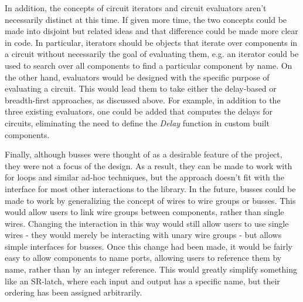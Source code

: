 \documentclass{article}
\newcommand{\FunctionName}[1]{\textit{#1}}
\begin{document}
In addition, the concepts of circuit iterators and circuit evaluators aren’t necessarily distinct at this time. If given more time, the two concepts could be made into disjoint but related ideas and that difference could be made more clear in code. In particular, iterators should be objects that iterate over components in a circuit without necessarily the goal of evaluating them, e.g. an iterator could be used to search over all components to find a particular component by name. On the other hand, evaluators would be designed with the specific purpose of evaluating a circuit. This would lead them to take either the delay-based or breadth-first approaches, as discussed above. For example, in addition to the three existing evaluators, one could be added that computes the delays for circuits, eliminating the need to define the \FunctionName{Delay} function in custom built components.

Finally, although busses were thought of as a desirable feature of the project, they were not a focus of the design. As a result, they can be made to work with for loops and similar ad-hoc techniques, but the approach doesn’t fit with the interface for most other interactions to the library. In the future, busses could be made to work by generalizing the concept of wires to wire groups or busses. This would allow users to link wire groups between components, rather than single wires. Changing the interaction in this way would still allow users to use single wires - they would merely be interacting with unary wire groups - but allows simple interfaces for busses. Once this change had been made, it would be fairly easy to allow components to name ports, allowing users to reference them by name, rather than by an integer reference. This would greatly simplify something like an SR-latch, where each input and output has a specific name, but their ordering has been assigned arbitrarily.



\end{document}

